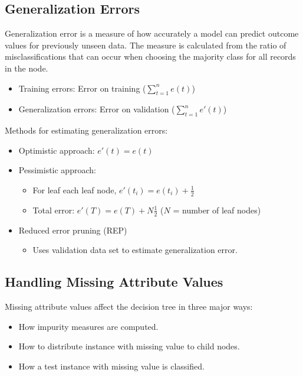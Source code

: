 \subsection{Generalization Errors}
Generalization error is a measure of how accurately a model can predict outcome values for previously unseen data.
The measure is calculated from the ratio of misclassifications that can occur when choosing the majority class for all records in the node.

\begin{itemize}
    \item Training errors: Error on training ($\sum_{t=1}^n e(t)$)
    \item Generalization errors: Error on validation ($\sum_{t=1}^n e'(t)$)
\end{itemize}

Methods for estimating generalization errors:
\begin{itemize}
    \item Optimistic approach: $e'(t) = e(t)$
    \item Pessimistic approach:
    \begin{itemize}
        \item For leaf each leaf node, $e'(t_i) = e(t_i)+\frac{1}{2}$
        \item Total error: $e'(T) = e(T) + N\frac{1}{2}$ ($N$ = number of leaf nodes)
    \end{itemize}
    \item Reduced error pruning (REP)
    \begin{itemize}
        \item Uses validation data set to estimate generalization error.
    \end{itemize}
\end{itemize}

\subsection{Handling Missing Attribute Values}
Missing attribute values affect the decision tree in three major ways:
\begin{itemize}
    \item How impurity measures are computed.
    \item How to distribute instance with missing value to child nodes.
    \item How a test instance with missing value is classified.
\end{itemize}

